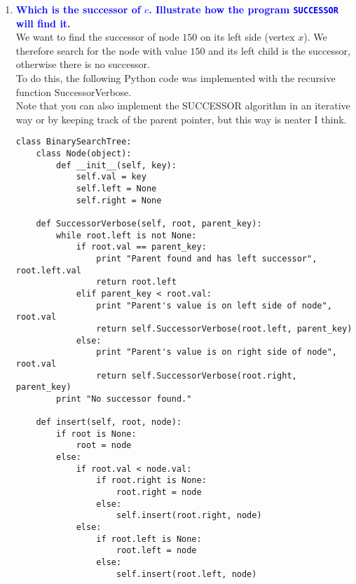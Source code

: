 \documentclass[11pt]{article}
\begin{document}
\begin{enumerate}
    \begin{enumerate}
    \item \textbf{\textcolor{blue}{Which is the successor of $c$. Illustrate how the program {\tt SUCCESSOR} will find it.}}
        \\ We want to find the successor of node $150$ on its left side (vertex $x$). We therefore search for the node with value $150$ and its left child is the successor, otherwise there is no successor.
        \\ To do this, the following Python code was implemented with the recursive function SuccessorVerbose.
        \\ Note that you can also implement the SUCCESSOR algorithm in an iterative way or by keeping track of the parent pointer, but this way is neater I think.
        \begin{verbatim}
class BinarySearchTree:
    class Node(object):
        def __init__(self, key):
            self.val = key
            self.left = None
            self.right = None
            
    def SuccessorVerbose(self, root, parent_key):
        while root.left is not None:
            if root.val == parent_key:
                print "Parent found and has left successor", root.left.val
                return root.left
            elif parent_key < root.val:
                print "Parent's value is on left side of node", root.val
                return self.SuccessorVerbose(root.left, parent_key)
            else:
                print "Parent's value is on right side of node", root.val
                return self.SuccessorVerbose(root.right, parent_key)
        print "No successor found."
        
    def insert(self, root, node):
        if root is None:
            root = node
        else:
            if root.val < node.val:
                if root.right is None:
                    root.right = node
                else:
                    self.insert(root.right, node)
            else:
                if root.left is None:
                    root.left = node
                else:
                    self.insert(root.left, node)
            

\end{verbatim}
\end{enumerate}
\end{enumerate}
\end{document}
